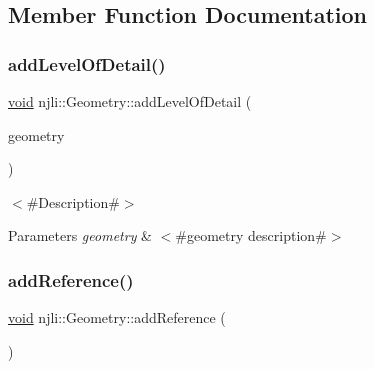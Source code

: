 \subsection{Member Function Documentation}
\mbox{\label{classnjli_1_1_geometry_a3cbdfa54d4321633f3c59c27a041fe52}} 
\subsubsection{\texorpdfstring{add\+Level\+Of\+Detail()}{addLevelOfDetail()}}
{\footnotesize\ttfamily \mbox{\hyperlink{_thread_8h_af1e856da2e658414cb2456cb6f7ebc66}{void}} njli\+::\+Geometry\+::add\+Level\+Of\+Detail (\begin{DoxyParamCaption}\item[{\mbox{\hyperlink{classnjli_1_1_level_of_detail}{Level\+Of\+Detail}} $\ast$}]{geometry }\end{DoxyParamCaption})}

$<$\#\+Description\#$>$


\begin{DoxyParams}{Parameters}
{\em geometry} & $<$\#geometry description\#$>$ \\
\hline
\end{DoxyParams}
\mbox{\label{classnjli_1_1_geometry_aaf9879b9197998f1a63dac38ead6354c}} 
\subsubsection{\texorpdfstring{add\+Reference()}{addReference()}}
{\footnotesize\ttfamily \mbox{\hyperlink{_thread_8h_af1e856da2e658414cb2456cb6f7ebc66}{void}} njli\+::\+Geometry\+::add\+Reference (\begin{DoxyParamCaption}\item[{\mbox{\hyperlink{classnjli_1_1_node}{Node}} $\ast$}]{ }\end{DoxyParamCaption})\hspace{0.3cm}{\ttfamily [protected]}}

\mbox{\label{classnjli_1_1_geometry_a6661dda8bb03d0f3d6e9764760b6b13f}} 
